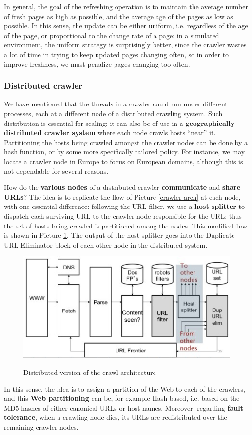 In general, the goal of the refreshing operation is to maintain the average number of fresh pages as high as possible, and the average age of the pages as low as possible. In this sense, the update can be either uniform, i.e. regardless of the age of the page, or proportional to the change rate of a page: in a simulated environment, the uniform strategy is surprisingly better, since the crawler wastes a lot of time in trying to keep updated pages changing often, so in order to improve freshness, we must penalize pages changing too often.

\subsubsection{Distributed crawler}

We have mentioned that the threads in a crawler could run under different processes, each at a different node of a distributed crawling system. Such distribution is essential for scaling; it can also be of use in a \textbf{geographically distributed crawler system} where each node crawls hosts “near” it. Partitioning the hosts being crawled amongst the crawler nodes can be done by a hash function, or by some more specifically tailored policy. For instance, we may locate a crawler node in Europe to focus on European domains, although this is not dependable for several reasons.

How do the \textbf{various nodes} of a distributed crawler \textbf{communicate} and \textbf{share URLs}? The idea is to replicate the flow of Picture \ref{crawler arch} at each node, with one essential difference: following the URL filter, we use a \textbf{host splitter} to dispatch each surviving URL to the crawler node responsible for the URL; thus the set of hosts being crawled is partitioned among the nodes. This modified flow is shown in Picture \ref{distr crw}. The output of the host splitter goes into the Duplicate URL Eliminator block of each other node in the distributed system. 

\begin{figure}[h!]
		\centering
		\includegraphics[scale = 1.8]{img/distributed crawler.jpg}
		\label{distr crw}
        \caption{Distributed version of the crawl architecture}
\end{figure}

In this sense, the idea is to assign a partition of the Web to each of the crawlers, and this \textbf{Web partitioning} can be, for example {Hash-based}, i.e. based on the MD5 hashes of either canonical URLs or host names. Moreover, regarding \textbf{fault tolerance}, when a crawling node dies, its URLs are redistributed over the remaining crawler nodes.




